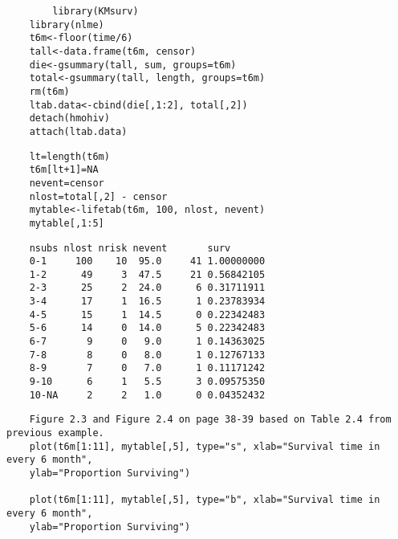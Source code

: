 \begin{frame}[fragile]
	
			\begin{framed}
		\begin{verbatim}
		library(KMsurv)
	library(nlme)
	t6m<-floor(time/6)
	tall<-data.frame(t6m, censor)
	die<-gsummary(tall, sum, groups=t6m)
	total<-gsummary(tall, length, groups=t6m)
	rm(t6m)
	ltab.data<-cbind(die[,1:2], total[,2])
	detach(hmohiv)
	attach(ltab.data)
\end{verbatim}
\end{framed}
\end{frame}
\begin{frame}[fragile]

\begin{framed}
\begin{verbatim}	
	lt=length(t6m)
	t6m[lt+1]=NA
	nevent=censor
	nlost=total[,2] - censor
	mytable<-lifetab(t6m, 100, nlost, nevent)
	mytable[,1:5]
\end{verbatim}
\end{framed}
\end{frame}
\begin{frame}[fragile]
	
	\begin{framed}
		\begin{verbatim}
	nsubs nlost nrisk nevent       surv
	0-1     100    10  95.0     41 1.00000000
	1-2      49     3  47.5     21 0.56842105
	2-3      25     2  24.0      6 0.31711911
	3-4      17     1  16.5      1 0.23783934
	4-5      15     1  14.5      0 0.22342483
	5-6      14     0  14.0      5 0.22342483
	6-7       9     0   9.0      1 0.14363025
	7-8       8     0   8.0      1 0.12767133
	8-9       7     0   7.0      1 0.11171242
	9-10      6     1   5.5      3 0.09575350
	10-NA     2     2   1.0      0 0.04352432
\end{verbatim}
\end{framed}
\end{frame}
\begin{frame}[fragile]
	
	\begin{framed}
		\begin{verbatim}
	Figure 2.3 and Figure 2.4 on page 38-39 based on Table 2.4 from previous example.
	plot(t6m[1:11], mytable[,5], type="s", xlab="Survival time in every 6 month", 
	ylab="Proportion Surviving")
	
	plot(t6m[1:11], mytable[,5], type="b", xlab="Survival time in every 6 month", 
	ylab="Proportion Surviving")
\end{verbatim}
\end{framed}
\end{frame}
